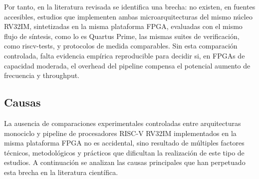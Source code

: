 Por tanto, en la literatura revisada se identifica una brecha: no existen, en fuentes accesibles, estudios que implementen ambas microarquitecturas del mismo núcleo RV32IM, sintetizadas en la misma plataforma FPGA, evaluadas con el mismo flujo de síntesis, como lo es Quartus Prime, las mismas suites de verificación, como riscv-tests, y protocolos de medida comparables. Sin esta comparación controlada, falta evidencia empírica reproducible para decidir si, en FPGAs de capacidad moderada, el overhead del pipeline compensa el potencial aumento de frecuencia y throughput.



\subsection{Causas}
\label{sec:Causas}


La ausencia de comparaciones experimentales controladas entre arquitecturas monociclo y pipeline de procesadores RISC-V RV32IM implementados en la misma plataforma FPGA no es accidental, sino resultado de múltiples factores técnicos, metodológicos y prácticos que dificultan la realización de este tipo de estudios. A continuación se analizan las causas principales que han perpetuado esta brecha en la literatura científica.

